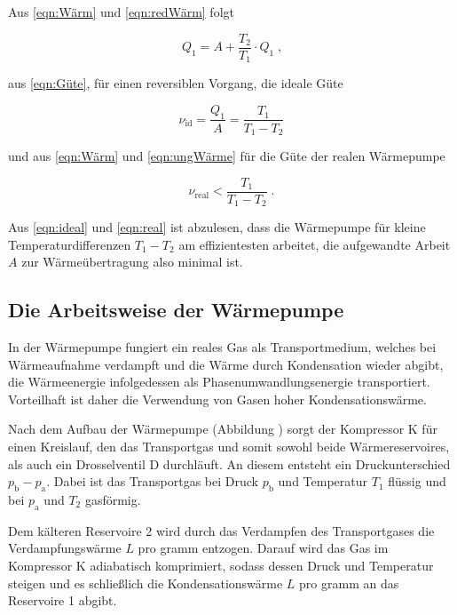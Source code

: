 Aus \ref{eqn:Wärm}  und \ref{eqn:redWärm} folgt

\begin{equation*}
    Q_1 = A + \frac{T_2}{T_1} \cdot Q_1 \; \text{,}
\end{equation*}

aus \ref{eqn:Güte}, für einen reversiblen Vorgang, die ideale Güte

\begin{equation}
    \nu_\text{id} = \frac{Q_1}{A} = \frac{T_1}{T_1 - T_2}
    \label{eqn:ideal}
\end{equation}

und aus \ref{eqn:Wärm} und \ref{eqn:ungWärme} für die Güte der realen Wärmepumpe

\begin{equation}
    \nu_\text{real} < \frac{T_1}{T_1 - T_2} \; \text{.}
    \label{eqn:real}
\end{equation}

Aus \ref{eqn:ideal} und \ref{eqn:real} ist abzulesen, dass die Wärmepumpe 
für kleine Temperaturdifferenzen $T_1 - T_2$ am effizientesten arbeitet, 
die aufgewandte Arbeit $A$ zur Wärmeübertragung also minimal ist.

\subsection{Die Arbeitsweise der Wärmepumpe}

In der Wärmepumpe fungiert ein reales Gas als Transportmedium, welches 
bei Wärmeaufnahme verdampft und die Wärme durch Kondensation wieder abgibt, 
die Wärmeenergie infolgedessen als Phasenumwandlungsenergie transportiert.
Vorteilhaft ist daher die Verwendung von Gasen hoher Kondensationswärme. 

Nach dem Aufbau der Wärmepumpe 
(Abbildung  ) sorgt der Kompressor K für einen Kreislauf, den das Transportgas 
und somit sowohl beide Wärmereservoires, als auch ein Drosselventil D 
durchläuft. An diesem entsteht ein Druckunterschied $p_\text{b} - p_\text{a}$. 
Dabei ist das Transportgas bei Druck $p_\text{b}$ und Temperatur $T_1$ flüssig 
und bei $p_\text{a}$ und $T_2$ gasförmig.

Dem kälteren Reservoire 2 wird durch das Verdampfen des Transportgases 
die Verdampfungswärme $L$ pro gramm entzogen. Darauf wird das Gas im 
Kompressor K adiabatisch komprimiert, sodass dessen Druck und Temperatur steigen
und es schließlich die Kondensationswärme $L$ pro gramm an das Reservoire 1 abgibt.

